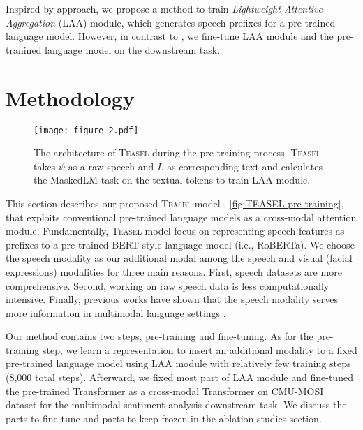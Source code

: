 \documentclass[letterpaper]{article} \usepackage{spconf,amsmath,graphicx}
\newcommand{\teasel}{\textsc{Teasel }}
\begin{document}
Inspired by \cite{tsimpoukelli2021multimodal} approach, we propose a method to train \textit{Lightweight Attentive Aggregation} (LAA) module, which generates speech prefixes for a pre-trained language model. However, in contrast to \cite{tsimpoukelli2021multimodal}, we fine-tune LAA module and the pre-tranined language model on the downstream task.











\section{Methodology}
\label{sec:methodolody}


\begin{figure}[t]
\centering
\texttt{[image: figure\_2.pdf]} \caption{The architecture of \teasel during the pre-training process. \teasel takes $\psi$ as a raw speech and $L$ as corresponding text and calculates the MaskedLM task on the textual tokens to train LAA module.}
\label{fig:TEASEL-pre-training}
\end{figure}


This section describes our proposed \teasel model , \autoref{fig:TEASEL-pre-training}, that exploits conventional pre-trained language models as a cross-modal attention module. Fundamentally, \teasel model focus on representing speech features as prefixes to a pre-trained BERT-style language model (i.e., RoBERTa). We choose the speech modality as our additional modal among the speech and visual (facial expressions) modalities for three main reasons. First, speech datasets are more comprehensive. Second, working on raw speech data is less computationally intensive. Finally, previous works have shown that the speech modality serves more information in multimodal language settings \cite{tsai2019MULT, yu2021le}. 


Our method contains two steps, pre-training and fine-tuning. As for the pre-training step, we learn a representation to insert an additional modality to a fixed pre-trained language model using LAA module with relatively few training steps (8,000 total steps). Afterward, we fixed most part of LAA module and fine-tuned the pre-trained Transformer as a cross-modal Transformer on CMU-MOSI dataset for the multimodal sentiment analysis downstream task. We discuss the parts to fine-tune and parts to keep frozen in the ablation studies section.
\end{document}
